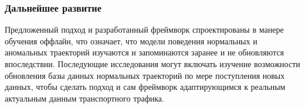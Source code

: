 \bigbreak

\subsubsection{Дальнейшее развитие}

Предложенный подход и разработанный фреймворк спроектированы в манере обучения оффлайн, что означает, что модели поведения нормальных и аномальных траекторий изучаются и запоминаются заранее и не обновляются впоследствии. Последующие исследования могут включать изучение возможности обновления базы данных нормальных траекторий по мере поступления новых данных, чтобы сделать подход и сам фреймворк адаптирующимся к реальным актуальным данным транспортного трафика.
